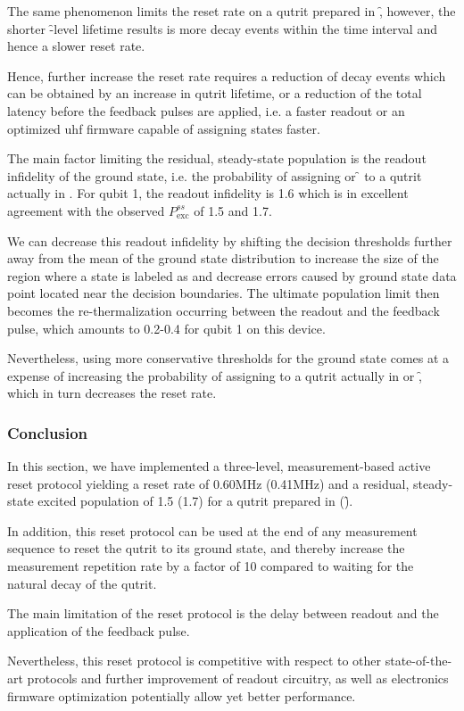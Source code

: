 The same phenomenon limits the reset rate on a qutrit prepared in \f, however, the shorter \f-level lifetime results is more decay events within the time interval and hence a slower reset rate. 

Hence, further increase the reset rate requires a reduction of decay events which can be obtained by an increase in qutrit lifetime, or a reduction of the total latency before the feedback pulses are applied, i.e. a faster readout or an optimized \gls{uhf} firmware capable of assigning states faster. 

The main factor limiting the residual, steady-state population is the readout infidelity of the ground state, i.e. the probability of assigning \e{} or \f{} to a qutrit actually in \g. For qubit 1, the readout infidelity is 1.6\unit{\permil} which is in excellent agreement with  the observed $P_\textrm{exc}^{ss}$ of 1.5\unit{\permil} and 1.7\unit{\permil}. 

We can decrease this readout infidelity by shifting the decision thresholds further away from the mean of the ground state distribution to increase the size of the region where a state is labeled as \g{} and decrease errors caused by ground state data point located near the decision boundaries.  The ultimate population limit then becomes the re-thermalization occurring between the readout and the feedback pulse, which amounts to 0.2-0.4\unit{\permil} for qubit 1 on this device. 

Nevertheless, using more conservative thresholds for the ground state comes at a expense of increasing the probability of assigning \g{} to a qutrit actually in \e{} or \f, which in turn decreases the reset rate.

\subsubsection{Conclusion}
In this section, we have implemented a three-level, measurement-based active reset protocol yielding a reset rate of 0.60\unit{MHz} (0.41\unit{MHz}) and a residual, steady-state excited population of 1.5\unit{\permil} (1.7\unit{\permil}) for a qutrit prepared in \e{} (\f).

In addition, this reset protocol can be used at the end of any measurement sequence to reset the qutrit to its ground state, and thereby increase the measurement repetition rate by a factor of 10 compared to waiting for the natural decay of the qutrit.

The main limitation of the reset protocol is the delay between readout and the application of the feedback pulse.

Nevertheless, this reset protocol is competitive with respect to other state-of-the-art protocols and further improvement of readout circuitry, as well as electronics firmware optimization potentially allow yet better performance.




